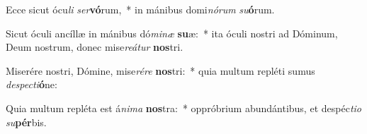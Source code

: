 \item Ecce sicut ócu\textit{li} \textit{ser}\textbf{vó}rum,~* in mánibus domi\textit{nó}\textit{rum} \textit{su}\textbf{ó}rum.
\item Sicut óculi ancíllæ in mánibus dó\textit{mi}\textit{næ} \textbf{su}æ:~* ita óculi nostri ad Dóminum, Deum nostrum, donec mise\textit{re}\textit{á}\textit{tur} \textbf{nos}tri.
\item Miserére nostri, Dómine, mise\textit{ré}\textit{re} \textbf{nos}tri:~* quia multum repléti sumus \textit{de}\textit{spec}\textit{ti}\textbf{ó}ne:
\item Quia multum repléta est á\textit{ni}\textit{ma} \textbf{nos}tra:~* oppróbrium abundántibus, et despéc\textit{ti}\textit{o} \textit{su}\textbf{pér}bis.
